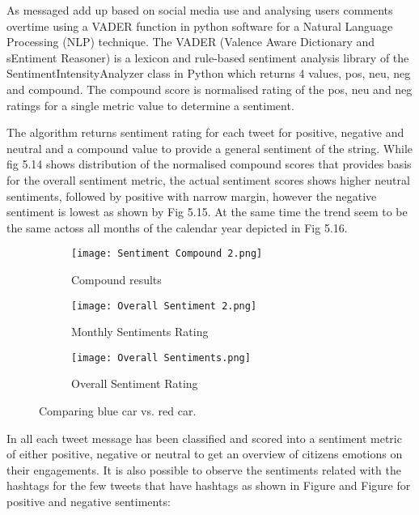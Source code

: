 As messaged add up based on social media use and analysing users comments overtime using a VADER function in python software for a Natural Language Processing (NLP) technique.  
The VADER (Valence Aware Dictionary and sEntiment Reasoner) is a lexicon and rule-based sentiment analysis library of the SentimentIntensityAnalyzer class in Python which returns 4 values, pos, neu, neg and compound.  The compound score is normalised rating of the pos, neu and neg ratings for a single metric value to determine a sentiment. 

The algorithm returns sentiment rating for each tweet for positive, negative and neutral and a compound value to provide a general sentiment of the string.  
While fig 5.14 shows distribution of the normalised compound scores that provides basis for the overall sentiment metric, the actual sentiment scores shows higher neutral sentiments, followed by positive with narrow margin, however the negative sentiment is lowest as shown by Fig 5.15.  At the same time the trend seem to be the same actoss all months of the calendar year depicted in Fig 5.16.\\

\begin{figure}
      \centering
	    \begin{subfigure}{0.25\linewidth}
		\texttt{[image: Sentiment Compound 2.png]}
		\caption{Compound results}
		\label{fig:subfig1}
	   \end{subfigure}
	   \begin{subfigure}{0.25\linewidth}
		\texttt{[image: Overall Sentiment 2.png]}
		\caption{Monthly Sentiments Rating}
		\label{fig:subfig2}
	    \end{subfigure}
	   \vfill
	   \begin{subfigure}{0.25\linewidth}
	   \texttt{[image: Overall Sentiments.png]}
	   \caption{Overall Sentiment Rating}
	   \label{fig:subfig3}
	   \end{subfigure}
	 \caption{Comparing blue car vs. red car.}
\end{figure}

In all each tweet message has been classified and scored into a sentiment metric of either positive, negative or neutral to get an overview of citizens emotions on their engagements.  It is also possible to observe the sentiments related with the hashtags for the few tweets that have hashtags as shown in Figure and Figure for positive and negative sentiments:\\

